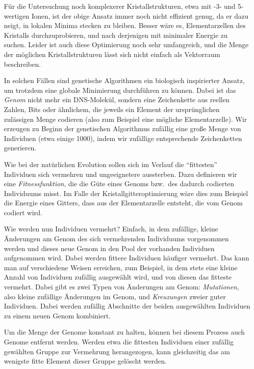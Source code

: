 Für die Untersuchung noch komplexerer Kristallstrukturen, etwa mit -3-
und 5-wertigen Ionen, ist der obige Ansatz immer noch nicht effizient
genug, da er dazu neigt, in lokalen Minima stecken zu bleiben. Besser
wäre es, Elementarzellen des Kristalls durchzuprobieren, und nach
derjenigen mit minimaler Energie zu suchen. Leider ist auch diese
Optimierung noch sehr umfangreich, und die Menge der möglichen
Kristallstrukturen lässt sich nicht einfach als Vektorraum beschreiben.

In solchen Fällen sind genetische Algorithmen ein biologisch
inspirierter Ansatz, um trotzdem eine globale Minimierung durchführen
zu können. Dabei ist das \emph{Genom} nicht mehr ein DNS-Molekül,
sondern eine Zeichenkette aus reellen Zahlen, Bits oder ähnlichem, die
jeweils ein Element der ursprünglichen zulässigen Menge codieren (also
zum Beispiel eine mögliche Elementarzelle). Wir erzeugen zu Beginn der
genetischen Algorithmus zufällig eine große Menge von Individuen (etwa
einige 1000), indem wir zufällige entsprechende Zeichenketten
generieren.

Wie bei der natürlichen Evolution sollen sich im Verlauf die
"`fittesten"' Individuen sich vermehren und ungeeignetere aussterben.
Dazu definieren wir eine \emph{Fitnessfunktion}, die die Güte eines
Genoms bzw.\ des dadurch codierten Individuums misst. Im Falle der
Kristallgitteroptimierung wäre dies zum Beispiel die Energie eines
Gitters, dass aus der Elementarzelle entsteht, die vom Genom codiert
wird.

Wie werden nun Individuen vermehrt? Einfach, in dem zufällige, kleine
Änderungen am Genom des sich vermehrenden Individuums vorgenommen
werden und dieses neue Genom in den Pool der vorhanden Individuen
aufgenommen wird. Dabei werden fittere Individuen häufiger
vermehrt. Das kann man auf verschiedene Weisen erreichen, zum
Beispiel, in dem stets eine kleine Anzahl von Individuen zufällig
ausgewählt wird, und von diesen das fitteste vermehrt.  Dabei gibt es
zwei Typen von Änderungen am Genom: \emph{Mutationen}, also kleine
zufällige Änderungen im Genom, und \emph{Kreuzungen} zweier guter
Individuen. Dabei werden zufällig Abschnitte der beiden ausgewählten
Individuen zu einem neuen Genom kombiniert.

Um die Menge der Genome konstant zu halten, können bei diesem Prozess
auch Genome entfernt werden. Werden etwa die fittesten Individuen
einer zufällig gewählten Gruppe zur Vermehrung herangezogen, kann
gleichzeitig das am wenigste fitte Element dieser Gruppe gelöscht
werden.


